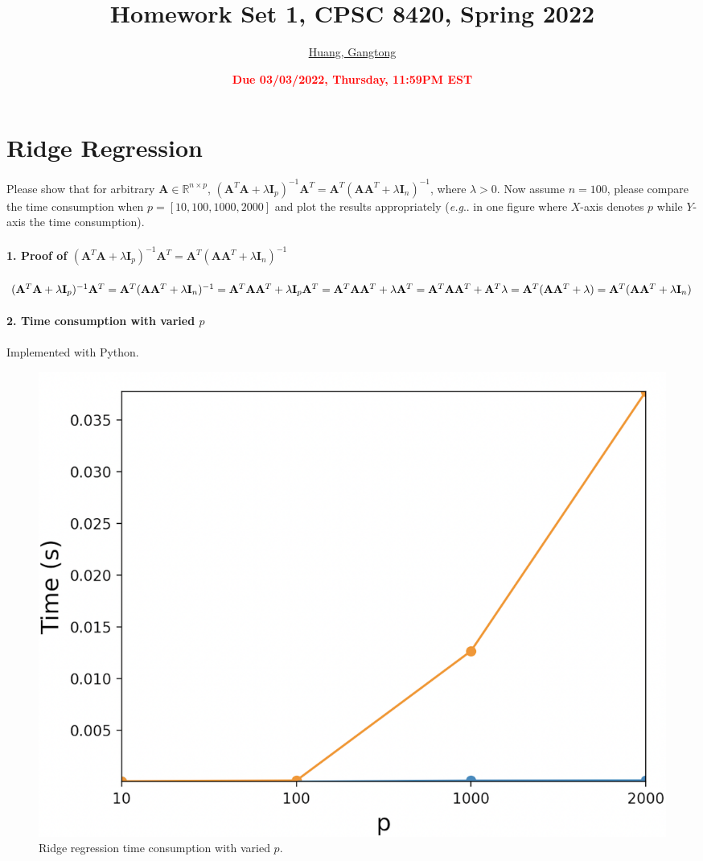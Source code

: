\documentclass[11pt]{article}
\title{{\bf Homework Set 1, CPSC 8420, Spring 2022}}
\author{\Large\underline{Huang, Gangtong}}
\date{\textbf{\Large\textcolor{red}{Due 03/03/2022, Thursday, 11:59PM EST}}}
\makeatletter
\newcommand{\R}{\mathbb{R}}
\newcommand{\minimize}{\operatorname*{minimize\ }}
\newcommand{\mtx}[1]{\mathbf{#1}}
\newcommand{\vct}[1]{\mathbf{#1}}
\def \mA {\mtx{A}}
\def \mI {\mtx{I}}
\def \mU {\mtx{U}}
\def \mX {\mtx{X}}
\def \vv {\vct{v}}
\def \R {\mathbb{R}}
\DeclareRobustCommand\onedot{\futurelet\@let@token\@onedot}
\def\@onedot{\ifx\@let@token.\else.\null\fi\xspace}
\def\eg{\emph{e.g}\onedot} \def\Eg{\emph{E.g}\onedot}
\makeatother
\begin{document}
\maketitle

\section*{Ridge Regression}
Please show that for arbitrary $\mA\in\R^{n\times p}$, $(\mA^T\mA+\lambda\mI_p)^{-1}\mA^T=\mA^T(\mA\mA^T+\lambda\mI_n)^{-1}$, where $\lambda>0$. Now assume $n=100$, please compare the time consumption when $p=[10,100,1000,2000]$ and plot the results appropriately (\eg in one figure where $X$-axis denotes $p$ while $Y$-axis the time consumption).
\\ \\
{\bf 1. Proof of $(\mA^T\mA+\lambda\mI_p)^{-1}\mA^T=\mA^T(\mA\mA^T+\lambda\mI_n)^{-1}$ }
\\ \\
$(\mA^T\mA+\lambda\mI_p)^{-1}\mA^T=\mA^T(\mA\mA^T+\lambda\mI_n)^{-1}\\=\mA^T\mA\mA^T+\lambda\mI_p\mA^T\\=\mA^T\mA\mA^T+\lambda\mA^T\\=\mA^T\mA\mA^T+\mA^T\lambda\\=   \mA^T(\mA\mA^T+\lambda)\\=\mA^T(\mA\mA^T+\lambda\mI_n)$
\\ \\
{\bf 2. Time consumption with varied $p$ }
\\ \\
Implemented with Python.
\\ 
\begin{figure}[h] %
\centering\includegraphics[width=0.45\linewidth]{prob1.png}
\caption{Ridge regression time consumption with varied $p$.} %
\label{fig:prob1}  %
\end{figure}
\vspace{4cm}
\end{document}
